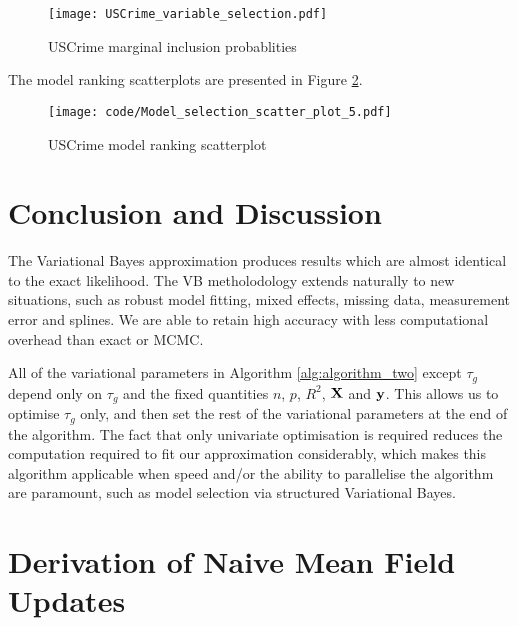\documentclass{amsart}[12pt]
\begin{document}
\begin{figure}[p]
	\texttt{[image: USCrime\_variable\_selection.pdf]}
	\caption{USCrime marginal inclusion probablities}
	\label{fig:USCrime_inclusion}
\end{figure}

The model ranking scatterplots are presented in Figure \ref{fig:USCrime_model_ranking}.

\begin{figure}[p]
	\texttt{[image: code/Model\_selection\_scatter\_plot\_5.pdf]}
	\caption{USCrime model ranking scatterplot}
	\label{fig:USCrime_model_ranking}
\end{figure}

\section{Conclusion and Discussion}
\label{sec:conclusion}

The Variational Bayes approximation produces results which are almost identical to the exact likelihood.
The VB metholodology extends naturally to new situations, such as robust model fitting, mixed effects, missing
data, measurement error and splines. We are able to retain high accuracy with less computational overhead than
exact or MCMC.

All of the variational parameters in Algorithm \ref{alg:algorithm_two} except $\tau_g$ depend only on
$\tau_g$ and the fixed quantities $n$, $p$, $R^2$, ${\bf X}$ and ${\bf y}$. This allows us to optimise $\tau_g$
only, and then set the rest of the variational parameters at the end of the algorithm. The fact that only
univariate optimisation is required reduces the computation required to fit our approximation considerably,
which makes this algorithm applicable when speed and/or the ability to parallelise the algorithm are
paramount, such as model selection via structured Variational Bayes.




\appendix
\section{Derivation of Naive Mean Field Updates}
\label{sec:appendix}
\end{document}
